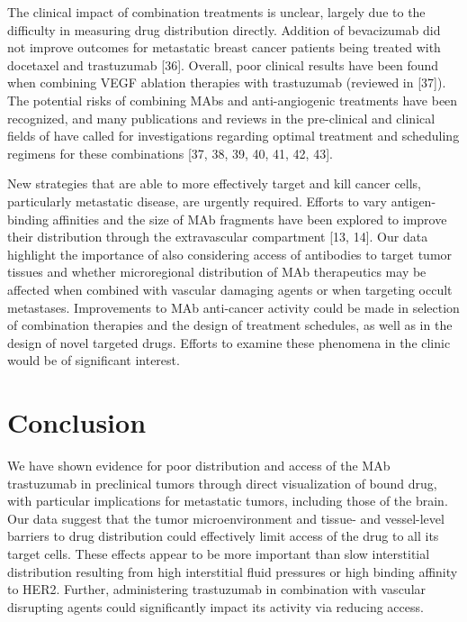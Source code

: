 The clinical impact of combination treatments is unclear, largely due to the difficulty in measuring drug distribution directly.
Addition of bevacizumab did not improve outcomes for metastatic breast cancer patients being treated with docetaxel and trastuzumab [36].
Overall, poor clinical results have been found when combining VEGF ablation therapies with trastuzumab (reviewed in [37]).
The potential risks of combining MAbs and anti-angiogenic treatments have been recognized, and many publications and reviews in the pre-clinical and clinical fields of have called for investigations regarding optimal treatment and scheduling regimens for these combinations [37, 38, 39, 40, 41, 42, 43].

New strategies that are able to more effectively target and kill cancer cells, particularly metastatic disease, are urgently required.
Efforts to vary antigen-binding affinities and the size of MAb fragments have been explored to improve their distribution through the extravascular compartment [13, 14].
Our data highlight the importance of also considering access of antibodies to target tumor tissues and whether microregional distribution of MAb therapeutics may be affected when combined with vascular damaging agents or when targeting occult metastases.
Improvements to MAb anti-cancer activity could be made in selection of combination therapies and the design of treatment schedules, as well as in the design of novel targeted drugs.
Efforts to examine these phenomena in the clinic would be of significant interest.

\section{Conclusion}

We have shown evidence for poor distribution and access of the MAb trastuzumab in preclinical tumors through direct visualization of bound drug, with particular implications for metastatic tumors, including those of the brain.
Our data suggest that the tumor microenvironment and tissue- and vessel-level barriers to drug distribution could effectively limit access of the drug to all its target cells.
These effects appear to be more important than slow interstitial distribution resulting from high interstitial fluid pressures or high binding affinity to HER2.
Further, administering trastuzumab in combination with vascular disrupting agents could significantly impact its activity via reducing access.



\endinput
